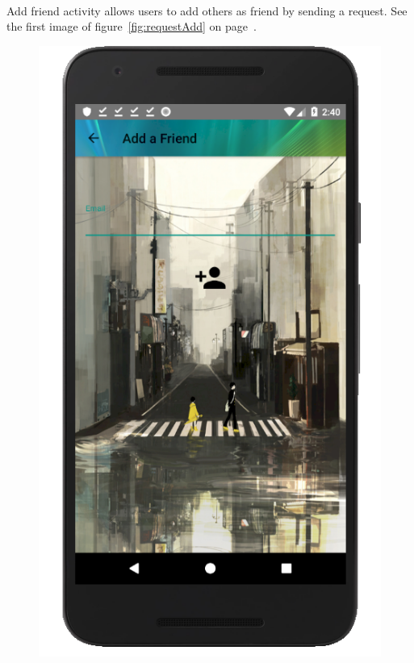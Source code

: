 \documentclass[12pt]{article}
\begin{document}
\paragraph{}
Add friend activity allows users to add others as friend by sending a request. See the first image of figure~\ref{fig:requestAdd} on page~\pageref{fig:requestAdd}.
\begin{figure}
	\centering
	\includegraphics[scale=0.25]{AddFriend.png}

\end{figure}
\end{document}
